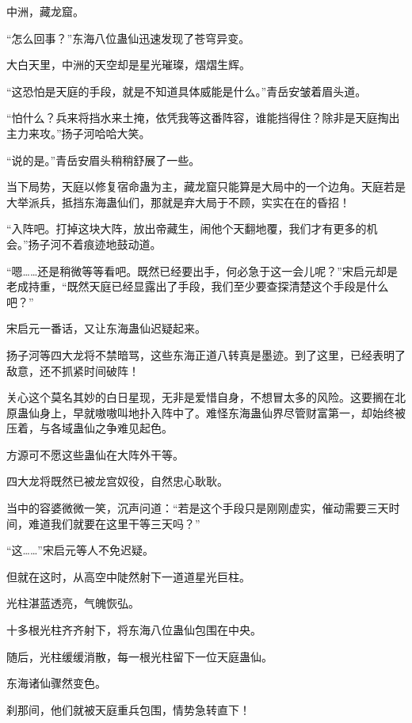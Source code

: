 
\begin{this_body}



中洲，藏龙窟。

“怎么回事？”东海八位蛊仙迅速发现了苍穹异变。

大白天里，中洲的天空却是星光璀璨，熠熠生辉。

“这恐怕是天庭的手段，就是不知道具体威能是什么。”青岳安皱着眉头道。

“怕什么？兵来将挡水来土掩，依凭我等这番阵容，谁能挡得住？除非是天庭掏出主力来攻。”扬子河哈哈大笑。

“说的是。”青岳安眉头稍稍舒展了一些。

当下局势，天庭以修复宿命蛊为主，藏龙窟只能算是大局中的一个边角。天庭若是大举派兵，抵挡东海蛊仙们，那就是弃大局于不顾，实实在在的昏招！

“入阵吧。打掉这块大阵，放出帝藏生，闹他个天翻地覆，我们才有更多的机会。”扬子河不着痕迹地鼓动道。

“嗯……还是稍微等等看吧。既然已经要出手，何必急于这一会儿呢？”宋启元却是老成持重，“既然天庭已经显露出了手段，我们至少要查探清楚这个手段是什么吧？”

宋启元一番话，又让东海蛊仙迟疑起来。

扬子河等四大龙将不禁暗骂，这些东海正道八转真是墨迹。到了这里，已经表明了敌意，还不抓紧时间破阵！

关心这个莫名其妙的白日星现，无非是爱惜自身，不想冒太多的风险。这要搁在北原蛊仙身上，早就嗷嗷叫地扑入阵中了。难怪东海蛊仙界尽管财富第一，却始终被压着，与各域蛊仙之争难见起色。

方源可不愿这些蛊仙在大阵外干等。

四大龙将既然已被龙宫奴役，自然忠心耿耿。

当中的容婆微微一笑，沉声问道：“若是这个手段只是刚刚虚实，催动需要三天时间，难道我们就要在这里干等三天吗？”

“这……”宋启元等人不免迟疑。

但就在这时，从高空中陡然射下一道道星光巨柱。

光柱湛蓝透亮，气魄恢弘。

十多根光柱齐齐射下，将东海八位蛊仙包围在中央。

随后，光柱缓缓消散，每一根光柱留下一位天庭蛊仙。

东海诸仙骤然变色。

刹那间，他们就被天庭重兵包围，情势急转直下！


\end{this_body}
